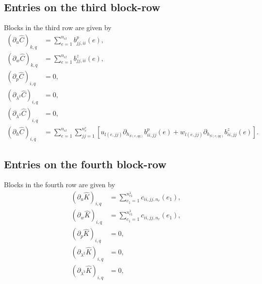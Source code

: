 \documentclass{article}
\begin{document}
\subsection{Entries on the third block-row}
Blocks in the third row are given by
\begin{align}
\left(\partial_u \hat{C}\right)_{k,q} &= \sum_{e=1}^{n_{el}} b_{jj,ii}^p(e), \tag{18.16}\\
\left(\partial_w \hat{C}\right)_{k,q} &= \sum_{e=1}^{n_{el}} b_{jj,ii}^z(e), \tag{18.17}\\
\left(\partial_p \hat{C}\right)_{i,q} &= 0, \tag{18.18}\\
\left(\partial_{\lambda^2} \hat{C}\right)_{i,q} &= 0, \tag{18.19}\\
\left(\partial_{\lambda^3} \hat{C}\right)_{i,q} &= 0, \tag{18.20}\\
\left(\partial_h \hat{C}\right)_{i,q} &= \sum_{e=1}^{n_{el}} \sum_{jj=1}^{n_e^e} \left[ u_{l(e,jj)} \partial_{h_{S(e,qq)}} b_{ii,jj}^p(e) + w_{l(e,jj)} \partial_{h_{S(e,qq)}} b_{ii,jj}^z(e) \right]. \tag{18.22}
\end{align}

\subsection{Entries on the fourth block-row}
Blocks in the fourth row are given by
\begin{align}
\left(\partial_u \hat{K}\right)_{i,q} &= \sum_{e_1=1}^{n_{e1}^1} c_{ii,jj,n_r}(e_1), \tag{18.23}\\
\left(\partial_w \hat{K}\right)_{i,q} &= \sum_{e_1=1}^{n_{e1}^1} c_{ii,jj,n_r}(e_1), \tag{18.24}\\
\left(\partial_p \hat{K}\right)_{i,q} &= 0, \tag{18.25}\\
\left(\partial_{\lambda^2} \hat{K}\right)_{i,q} &= 0, \tag{18.26}\\
\left(\partial_{\lambda^3} \hat{K}\right)_{i,q} &= 0, \tag{18.27}
\end{align}
\end{document}
